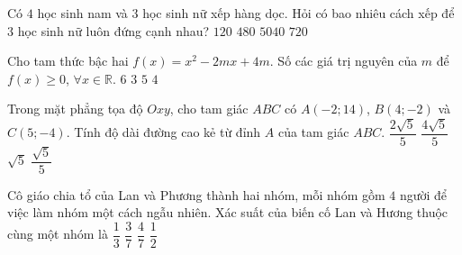 \begin{ex}%
	Có $4$ học sinh nam và $3$ học sinh nữ xếp hàng dọc. Hỏi có bao nhiêu cách xếp để $3$ học sinh nữ luôn đứng cạnh nhau?
	\choice
	{$120$}
	{$480$}
	{$5040$}
	{\True $720$}
\end{ex}
\begin{ex}%
	Cho tam thức bậc hai $f(x)=x^2-2mx+4m$. Số các giá trị nguyên của $m$ để $f(x)\ge 0$, $\forall x\in\mathbb{R}$.
	\choice
	{\True $6$}
	{$3$}
	{$5$}
	{$4$}
\end{ex}
\begin{ex}%
	Trong mặt phẳng tọa độ $Oxy$, cho tam giác $ABC$ có $A(-2;14)$, $B(4;-2)$ và $C(5;-4)$. Tính độ dài đường cao kẻ từ đỉnh $A$ của tam giác $ABC$.
	\choice
	{$\dfrac{2\sqrt{5}}{5}$}
	{\True $\dfrac{4\sqrt{5}}{5}$}
	{$\sqrt{5}$}
	{$\dfrac{\sqrt{5}}{5}$}
\end{ex}
\begin{ex}%
	Cô giáo chia tổ của Lan và Phương thành hai nhóm, mỗi nhóm gồm $4$ người để việc làm nhóm một cách ngẫu nhiên. Xác suất của biến cố Lan và Hương thuộc cùng một nhóm là
	\choice
	{$\dfrac{1}{3}$}
	{\True $\dfrac{3}{7}$}
	{$\dfrac{4}{7}$}
	{$\dfrac{1}{2}$}
\end{ex}

